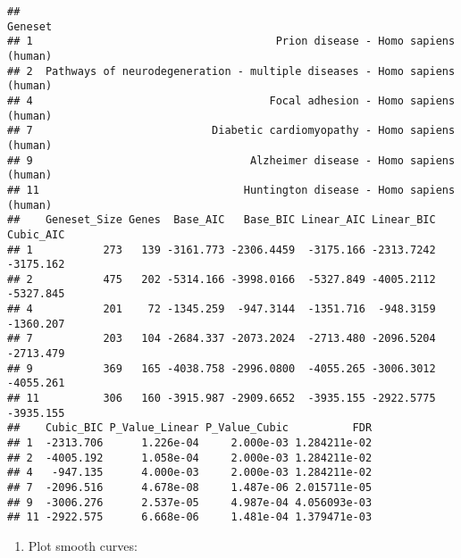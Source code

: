 \documentclass[
]{article}
\providecommand{\tightlist}{%
  \setlength{\itemsep}{0pt}\setlength{\parskip}{0pt}}
\begin{document}
\begin{verbatim}
##                                                                     Geneset
## 1                                      Prion disease - Homo sapiens (human)
## 2  Pathways of neurodegeneration - multiple diseases - Homo sapiens (human)
## 4                                     Focal adhesion - Homo sapiens (human)
## 7                            Diabetic cardiomyopathy - Homo sapiens (human)
## 9                                  Alzheimer disease - Homo sapiens (human)
## 11                                Huntington disease - Homo sapiens (human)
##    Geneset_Size Genes  Base_AIC   Base_BIC Linear_AIC Linear_BIC Cubic_AIC
## 1           273   139 -3161.773 -2306.4459  -3175.166 -2313.7242 -3175.162
## 2           475   202 -5314.166 -3998.0166  -5327.849 -4005.2112 -5327.845
## 4           201    72 -1345.259  -947.3144  -1351.716  -948.3159 -1360.207
## 7           203   104 -2684.337 -2073.2024  -2713.480 -2096.5204 -2713.479
## 9           369   165 -4038.758 -2996.0800  -4055.265 -3006.3012 -4055.261
## 11          306   160 -3915.987 -2909.6652  -3935.155 -2922.5775 -3935.155
##    Cubic_BIC P_Value_Linear P_Value_Cubic          FDR
## 1  -2313.706      1.226e-04     2.000e-03 1.284211e-02
## 2  -4005.192      1.058e-04     2.000e-03 1.284211e-02
## 4   -947.135      4.000e-03     2.000e-03 1.284211e-02
## 7  -2096.516      4.678e-08     1.487e-06 2.015711e-05
## 9  -3006.276      2.537e-05     4.987e-04 4.056093e-03
## 11 -2922.575      6.668e-06     1.481e-04 1.379471e-03
\end{verbatim}

\begin{enumerate}
\def\labelenumi{\arabic{enumi}.}
\setcounter{enumi}{5}
\tightlist
\item
  Plot smooth curves:
\end{enumerate}
\end{document}

